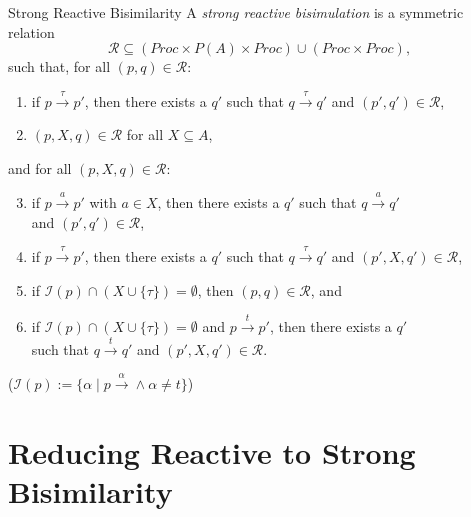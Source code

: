 \documentclass[american]{beamer}
\begin{document}
\begin{frame}{Strong Reactive Bisimilarity}
A \emph{strong reactive bisimulation} is a symmetric relation 
$$\mathcal{R} \subseteq (\mathit{Proc} \times \mathit{P}(A) \times \mathit{Proc}) \cup (\mathit{Proc} \times \mathit{Proc}),$$
such that, for all $(p,q) \in \mathcal{R}$:
\begin{enumerate}
    \item if $p \xrightarrow{\tau} p'$, then there exists a $q'$ such that $q \xrightarrow{\tau} q'$ and $(p',q') \in \mathcal{R}$,
    \item $(p,X,q) \in \mathcal{R}$ for all $X \subseteq A$,
\end{enumerate}
and for all $(p,X,q) \in \mathcal{R}$:
\begin{enumerate}
    \setcounter{enumi}{2}
    \item if $p \xrightarrow{a} p'$ with $a \in X$, then there exists a $q'$ such that $q \xrightarrow{a} q'$ \\and $(p',q') \in \mathcal{R}$,
    \item if $p \xrightarrow{\tau} p'$, then there exists a $q'$ such that $q \xrightarrow{\tau} q'$ and $(p',X,q') \in \mathcal{R}$,
    \item if $\mathcal{I}(p) \cap (X \cup \{\tau\}) = \emptyset$, then $(p,q) \in \mathcal{R}$, and
    \item if $\mathcal{I}(p) \cap (X \cup \{\tau\}) = \emptyset$ and $p \xrightarrow{t} p'$, then there exists a $q'$ \\such that $q \xrightarrow{t} q'$ and $(p',X,q') \in \mathcal{R}$.
\end{enumerate}
\footnotesize($\mathcal{I}(p) := \{ \alpha \mid p \xrightarrow{\alpha} \wedge \alpha \neq t \}$)
\end{frame}

\section{Reducing Reactive to Strong Bisimilarity}
\end{document}
